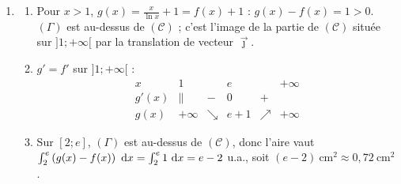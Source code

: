 \begin{corrige}
\begin{sol}
\begin{enumerate}
\begin{enumerate}
      \end{enumerate}
\item \begin{enumerate}
      \item Pour $x > 1$, $g(x) = \frac{x}{\ln x} + 1 = f(x) + 1$ : $g(x) - f(x) = 1 > 0$. $(\Gamma)$ est au-dessus de $(\mathscr{C})$ ;
            c'est l'image de la partie de $(\mathscr{C})$ situ\'ee sur $]1;+\infty[$ par la translation de vecteur $\vec{\jmath}$.
      \item $g' = f'$ sur $]1 ; +\infty[$ :
            \[
            \begin{array}{c|ccccc}
            x & 1 & & e & & +\infty \\ \hline
            g'(x) & \| & - & 0 & + & \\ \hline
            g(x) & +\infty & \searrow & e + 1 & \nearrow & +\infty
            \end{array}
            \]
      \item Sur $[2 ; e]$, $(\Gamma)$ est au-dessus de $(\mathscr{C})$, donc l'aire vaut
            $\int_2^e \left( g(x) - f(x) \right) ~\mathrm{d}x = \int_2^e 1 ~\mathrm{d}x = e - 2$ u.a., soit $\boxed{(e - 2)~\text{cm}^2 \approx 0{,}72~\text{cm}^2}$.
      \end{enumerate}
\end{enumerate}
\end{sol}


\end{corrige}
